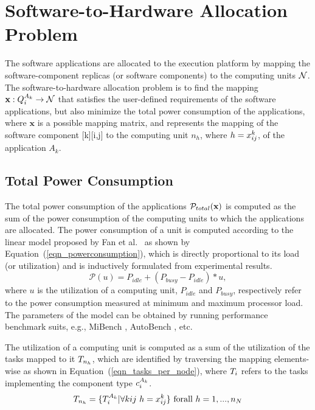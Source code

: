 \section{Software-to-Hardware Allocation Problem}\label{sec_problem}
The software applications are allocated to the execution platform by mapping the software-component replicas (or software components)   to the computing units $\mathcal{N}$. The software-to-hardware allocation problem is to find the mapping $\x:\sss{Q}\rightarrow\nodes$ that satisfies the user-defined requirements of the software applications, but also minimize the total power consumption of the applications, where $\textbf{x}$ is a possible mapping matrix, and {\ttxkij } represents the mapping of the software component [k][i,j] to the computing unit $n_h$, where $h=x^{k}_{ij}$, of the application $A_k$.

\subsection{Total Power Consumption}
The total power consumption of the applications $\mathcal{P}_{total}(\textbf{x})$ is computed as the sum of the power consumption of the computing units to which the applications are allocated. The power consumption of a unit is computed according to the linear model proposed by Fan et al.~\cite{Fan2007PowerComputer} as shown by Equation~(\ref{eqn_powerconsumption}), which is directly proportional to its load (or utilization) and is inductively formulated from experimental results.
\begin{equation}
\label{eqn_powerconsumption}
\mathcal{P}(u)=P_{idle} + (P_{busy}-P_{idle})*u,
\end{equation}
where $u$ is the utilization of a computing unit, $P_{idle}$ and $P_{busy}$, respectively refer to the power consumption measured at minimum and maximum processor load. The parameters of the model can be obtained by running performance benchmark suits, e.g., MiBench \cite{Guthaus2001MiBench:Suite}, AutoBench \cite{EMBC2018AutoBenchProcessors}, etc. 

The utilization of a computing unit is computed as a sum of the utilization of the tasks mapped to it $\ssb{T}[n_h]$, which are identified by traversing the mapping elements-wise \ttxkij{} as shown in Equation~(\ref{eqn_tasks_per_node}), where $\ssb{T}$ refers to the tasks implementing the component type $\sss{c}$.
\begin{align}
\label{eqn_tasks_per_node}
\ssb{T}[n_h]=\{\sss{T} | \forall kij\ h=\xkij \}   \mbox{  forall } h= 1,...,n_N
\end{align}

